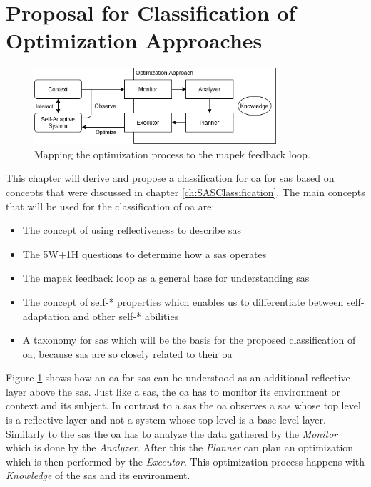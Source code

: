 \newpage
\section{Proposal for Classification of Optimization Approaches}
\label{ch:Proposal}

\begin{figure}[t]
    \centering
    \includegraphics[width=0.8\textwidth]{images/ClassificationProposal-OptimizationMAPEK_horizontal.png}
    \caption{Mapping the optimization process to the \acrshort{mapek} feedback loop.}
    \label{fig:MappingOptMAPEK}
\end{figure}

This chapter will derive and propose a classification for \acrshort{oa} for \acrshort{sas}
based on concepts that were discussed in chapter \ref{ch:SASClassification}.
The main concepts that will be used for the classification of \acrshort{oa} are:
\begin{itemize}[nosep]
    \item The concept of using reflectiveness to describe \acrshort{sas}
    \item The 5W+1H questions to determine how a \acrshort{sas} operates
    \item The \acrshort{mapek} feedback loop as a general base for understanding \acrshort{sas}
    \item The concept of self-* properties which enables us to differentiate between self-adaptation
    and other self-* abilities
    \item A taxonomy for \acrshort{sas} which will be the basis for the proposed classification of \acrshort{oa},
    because \acrshort{sas} are so closely related to their \acrshort{oa}
\end{itemize}

\noindent Figure \ref{fig:MappingOptMAPEK} shows how an \acrshort{oa} for \acrshort{sas} can be understood as an additional reflective layer above the \acrshort{sas}.
Just like a \acrshort{sas}, the \acrshort{oa} has to monitor its environment or context and its subject.
In contrast to a \acrshort{sas} the \acrshort{oa} observes a \acrshort{sas} whose top level is a reflective layer and not a system whose top level is a base-level layer.
Similarly to the \acrshort{sas} the \acrshort{oa} has to analyze the data gathered by the \textit{Monitor} which is done by the \textit{Analyzer}.
After this the \textit{Planner} can plan an optimization which is then performed by the \textit{Executor}.
This optimization process happens with \textit{Knowledge} of the \acrshort{sas} and its environment.

